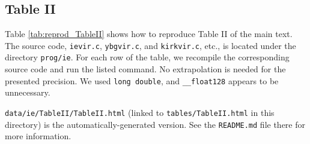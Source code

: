 \documentclass[preprint]{revtex4-1}
\numberwithin{equation}{subsection}
\numberwithin{table}{section}
\begin{document}
%
%
%
%
%



\subsection{Table II}


Table \ref{tab:reprod_TableII}
shows how to reproduce Table II of the main text.
%
The source code,
\texttt{ievir.c}, \texttt{ybgvir.c}, and \texttt{kirkvir.c}, etc.,
is located under the directory
\texttt{prog/ie}.
%
For each row of the table,
we recompile the corresponding source code
and run the listed command.
%
No extrapolation is needed for the presented precision.
%
We used \texttt{long double},
and \texttt{\_\_float128} appears to be unnecessary.

\texttt{data/ie/TableII/TableII.html}
(linked to \texttt{tables/TableII.html} in this directory)
is the automatically-generated version.
See the \texttt{README.md} file there for more information.
\end{document}
